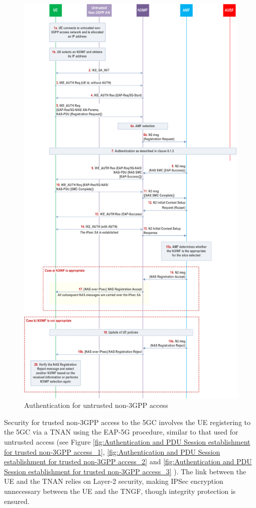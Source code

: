 \begin{figure}
    \centering
    \includegraphics[width=0.75\linewidth]{figs/Authentication for untrusted non-3GPP access.png}
    \caption{Authentication for untrusted non-3GPP access}
    \label{fig:Authentication for untrusted non-\ac{3GPP} access}
\end{figure}

Security for trusted non-\ac{3GPP} access to the \ac{5GC} involves the \ac{UE} registering to the \ac{5GC} via a \ac{TNAN} using the \ac{EAP-5G} procedure, similar to that used for untrusted access (see Figure \ref{fig:Authentication and PDU Session establishment for trusted non-3GPP access_1}, \ref{fig:Authentication and PDU Session establishment for trusted non-3GPP access_2} and \ref{fig:Authentication and PDU Session establishment for trusted non-3GPP access_3} ). The link between the \ac{UE} and the \ac{TNAN} relies on Layer-2 security, making \ac{IPSec} encryption unnecessary between the \ac{UE} and the \ac{TNGF}, though integrity protection is ensured.

